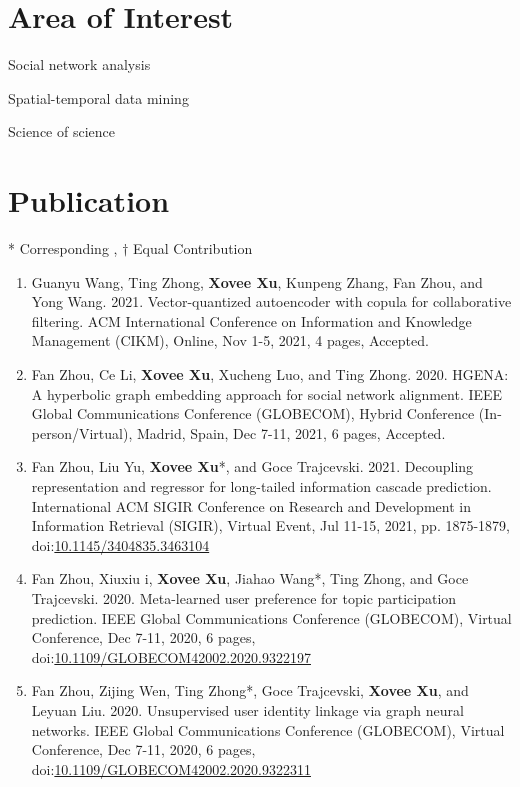 \section*{Area of Interest}
\indent

Social network analysis

Spatial-temporal data mining

Science of science

\section*{Publication}
\indent

* Corresponding
, $\dagger$ Equal Contribution


\begin{enumerate}[resume]
    \item Guanyu Wang, Ting Zhong, \textbf{Xovee Xu}, Kunpeng Zhang, Fan Zhou, and Yong Wang. 2021. Vector-quantized autoencoder with copula for collaborative filtering. ACM International Conference on Information and Knowledge Management (CIKM), Online, Nov 1-5, 2021, 4 pages, Accepted. 
    \item Fan Zhou, Ce Li, \textbf{Xovee Xu}, Xucheng Luo, and Ting Zhong. 2020. HGENA: A hyperbolic graph embedding approach for social network alignment. IEEE Global Communications Conference (GLOBECOM), Hybrid Conference (In-person/Virtual), Madrid, Spain, Dec 7-11, 2021, 6 pages, Accepted. 
    \item Fan Zhou, Liu Yu, \textbf{Xovee Xu}*, and Goce Trajcevski. 2021. Decoupling representation and regressor for long-tailed information cascade prediction. International ACM SIGIR Conference on Research and Development in Information Retrieval (SIGIR), Virtual Event, Jul 11-15, 2021, pp. 1875-1879, doi:\href{https://doi.org/10.1145/3404835.3463104}{10.1145/3404835.3463104}
    \item Fan Zhou, Xiuxiu \swashQ i, \textbf{Xovee Xu}, Jiahao Wang*, Ting Zhong, and Goce Trajcevski. 2020. Meta-learned user preference for topic participation prediction. IEEE Global Communications Conference (GLOBECOM), Virtual Conference, Dec 7-11, 2020, 6 pages, doi:\href{https://doi.org/10.1109/GLOBECOM42002.2020.9322197}{10.1109/GLOBECOM42002.2020.9322197}
    \item Fan Zhou, Zijing Wen, Ting Zhong*, Goce Trajcevski, \textbf{Xovee Xu}, and Leyuan Liu. 2020. Unsupervised user identity linkage via graph neural networks. IEEE Global Communications Conference (GLOBECOM), Virtual Conference, Dec 7-11, 2020, 6 pages, doi:\href{https://doi.org/10.1109/GLOBECOM42002.2020.9322311}{10.1109/GLOBECOM42002.2020.9322311}

\end{enumerate}
